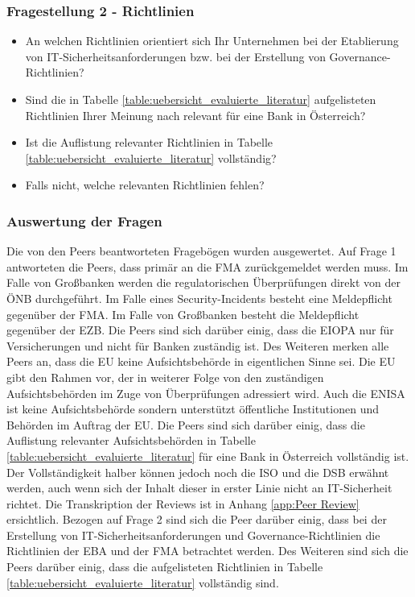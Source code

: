 \subsubsection{Fragestellung 2 - Richtlinien}
\begin{itemize}
    \item An welchen Richtlinien orientiert sich Ihr Unternehmen bei der Etablierung von IT-Sicherheitsanforderungen bzw. bei der Erstellung von Governance-Richtlinien?
    \item Sind die in Tabelle \ref{table:uebersicht_evaluierte_literatur} aufgelisteten Richtlinien Ihrer Meinung nach relevant für eine Bank in Österreich?
    \item Ist die Auflistung relevanter Richtlinien in Tabelle \ref{table:uebersicht_evaluierte_literatur} vollständig?
    \item Falls nicht, welche relevanten Richtlinien fehlen?
\end{itemize}
\bigbreak

\subsubsection{Auswertung der Fragen}
Die von den Peers beantworteten Fragebögen wurden ausgewertet. Auf Frage 1 antworteten die Peers, dass primär an die FMA zurückgemeldet werden muss. Im Falle von Großbanken werden die regulatorischen Überprüfungen direkt von der ÖNB durchgeführt. Im Falle eines Security-Incidents besteht eine Meldepflicht gegenüber der FMA. Im Falle von Großbanken besteht die Meldepflicht gegenüber der EZB. Die Peers sind sich darüber einig, dass die EIOPA nur für Versicherungen und nicht für Banken zuständig ist. Des Weiteren merken alle Peers an, dass die EU keine Aufsichtsbehörde in eigentlichen Sinne sei. Die EU gibt den Rahmen vor, der in weiterer Folge von den zuständigen Aufsichtsbehörden im Zuge von Überprüfungen adressiert wird. Auch die ENISA ist keine Aufsichtsbehörde sondern unterstützt öffentliche Institutionen und Behörden im Auftrag der EU. 
Die Peers sind sich darüber einig, dass die Auflistung relevanter Aufsichtsbehörden in Tabelle \ref{table:uebersicht_evaluierte_literatur} für eine Bank in Österreich vollständig ist. Der Vollständigkeit halber können jedoch noch die ISO und die DSB erwähnt werden, auch wenn sich der Inhalt dieser in erster Linie nicht an IT-Sicherheit richtet. Die Transkription der Reviews ist in Anhang \ref{app:Peer Review} ersichtlich.
\bigbreak
Bezogen auf Frage 2 sind sich die Peer darüber einig, dass bei der Erstellung von IT-Sicherheitsanforderungen und Governance-Richtlinien die Richtlinien der EBA und der FMA betrachtet werden. Des Weiteren sind sich die Peers darüber einig, dass die aufgelisteten Richtlinien in Tabelle \ref{table:uebersicht_evaluierte_literatur} vollständig sind. 

